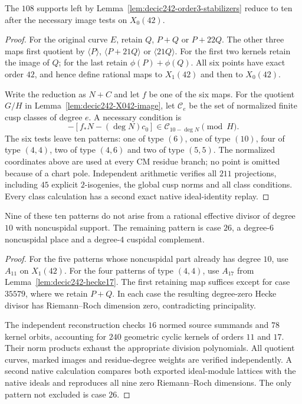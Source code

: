 




\begin{lemma}\label{lem:decic242-X042-refinement}
The $108$ supports left by
Lemma~\ref{lem:decic242-order3-stabilizers} reduce to ten after
the necessary image tests on $X_0(42)$.
\end{lemma}
\begin{proof}
For the original curve $E$, retain $Q$, $P+Q$ or $P+22Q$.
The other three maps first quotient by
$\langle P\rangle$, $\langle P+21Q\rangle$ or
$\langle21Q\rangle$.
For the first two kernels retain the image of $Q$; for the last
retain $\phi(P)+\phi(Q)$.
All six points have exact order $42$, and hence define rational
maps to $X_1(42)$ and then to $X_0(42)$.

Write the reduction as $N+C$ and let $f$ be one of the six maps.
For the quotient $G/H$ in Lemma~\ref{lem:decic242-X042-image},
let $\mathcal C_e$ be the set of normalized finite cusp classes
of degree $e$. A necessary condition is
\[
 -[f_*N-(\deg N)c_0]\in\mathcal C_{10-\deg N}\pmod H.
\]
The six tests leave ten patterns: one of type $(6)$, one of type
$(10)$, four of type $(4,4)$, two of type $(4,6)$ and two of type
$(5,5)$.
The normalized coordinates above are used at every CM residue
branch; no point is omitted because of a chart pole.
Independent arithmetic verifies all $211$ projections, including
$45$ explicit $2$-isogenies, the global cusp norms and all class
conditions. Every class calculation has a second exact native
ideal-identity replay.
\end{proof}



\begin{lemma}\label{lem:decic242-final-norm-sieve}
Nine of these ten patterns do not arise from a rational effective
divisor of degree $10$ with noncuspidal support.
The remaining pattern is case $26$, a degree-$6$ noncuspidal
place and a degree-$4$ cuspidal complement.
\end{lemma}
\begin{proof}
For the five patterns whose noncuspidal part already has degree
$10$, use $A_{11}$ on $X_1(42)$.
For the four patterns of type $(4,4)$, use $A_{17}$ from
Lemma~\ref{lem:decic242-hecke17}.
The first retaining map suffices except for case $35579$, where
we retain $P+Q$.
In each case the resulting degree-zero Hecke divisor has
Riemann--Roch dimension zero, contradicting principality.

The independent reconstruction checks $16$ normed source
summands and $78$ kernel orbits, accounting for $240$ geometric
cyclic kernels of orders $11$ and $17$.
Their norm products exhaust the appropriate division polynomials.
All quotient curves, marked images and residue-degree weights
are verified independently.
A second native calculation compares both exported ideal-module
lattices with the native ideals and reproduces all nine zero
Riemann--Roch dimensions.
The only pattern not excluded is case $26$.
\end{proof}

